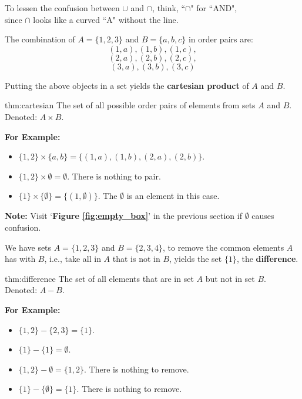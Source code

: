 \begin{Tip}
    To lessen the confusion between $\cup$ and $\cap$, think, ``$\cap$" for ``AND",\\
    since $\cap$ looks like a curved ``A" without the line.\\
\end{Tip}

\noindent
The combination of $A=\{1,2,3\}$ and $B=\{a,b,c\}$ in order pairs are:
$$(1,a), (1,b), (1,c), $$
$$(2,a), (2,b), (2,c), $$
$$(3,a), (3,b), (3,c)$$

\noindent
Putting the above objects in a set yields the \textbf{cartesian product} of $A$ and $B$.

\begin{theo}{thm:cartesian}
    The set of all possible order pairs of elements from sets $A$ and $B$.\\
    Denoted: $A \times B$.
\end{theo}

\noindent
\textbf{For Example:}
\begin{itemize}
    \item $\{1, 2\} \times \{a, b\} = \{(1,a), (1,b), (2,a), (2,b)\}$.
    \item $\{1,2\} \times \emptyset = \emptyset$. There is nothing to pair.
    \item $\{1\} \times \{\emptyset\} = \{(1,\emptyset)\}$. The $\emptyset$ is an element in this case.
\end{itemize}

\begin{Note}
    \textbf{Note:} Visit `\textbf{Figure \ref{fig:empty_box}}' in the previous section if $\emptyset$ causes confusion.\\
\end{Note}


\noindent
We have sets $A=\{1,2,3\}$ and $B=\{2,3,4\}$, to remove the common elements
$A$ has with $B$, i.e., take all in $A$ that is not in $B$, yields the set $\{1\}$, the \textbf{difference}.\\

\begin{theo}[Difference]{thm:difference}
    The set of all elements that are in set $A$ but not in set $B$.\\
    Denoted: $A - B$.
\end{theo}

\noindent
\textbf{For Example:}
\begin{itemize}
    \item $\{1, 2\} - \{2, 3\} = \{1\}$.
    \item $\{1\} - \{1\} = \emptyset$.
    \item $\{1,2\} - \emptyset = \{1, 2\}$. There is nothing to remove.
    \item $\{1\} - \{\emptyset\} = \{1\}$. There is nothing to remove.
\end{itemize}


